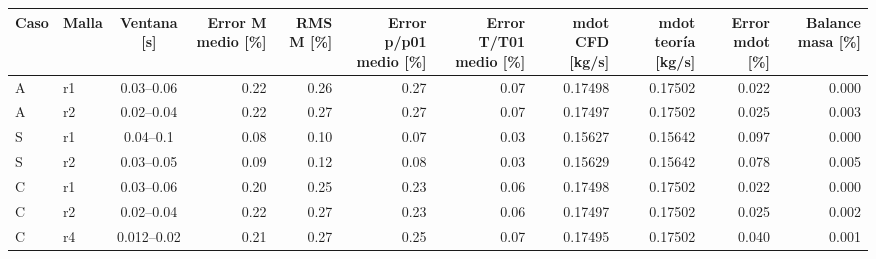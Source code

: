 \begin{tabular}{llcrrrrrrrr}
\toprule
Caso & Malla & Ventana [s] & Error M medio [\%] & RMS M [\%] & Error p/p01 medio [\%] & Error T/T01 medio [\%] & mdot CFD [kg/s] & mdot teoría [kg/s] & Error mdot [\%] & Balance masa [\%] \\
\midrule
A & r1 & 0.03–0.06 & 0.22 & 0.26 & 0.27 & 0.07 & 0.17498 & 0.17502 & 0.022 & 0.000 \\
A & r2 & 0.02–0.04 & 0.22 & 0.27 & 0.27 & 0.07 & 0.17497 & 0.17502 & 0.025 & 0.003 \\
S & r1 & 0.04–0.1 & 0.08 & 0.10 & 0.07 & 0.03 & 0.15627 & 0.15642 & 0.097 & 0.000 \\
S & r2 & 0.03–0.05 & 0.09 & 0.12 & 0.08 & 0.03 & 0.15629 & 0.15642 & 0.078 & 0.005 \\
C & r1 & 0.03–0.06 & 0.20 & 0.25 & 0.23 & 0.06 & 0.17498 & 0.17502 & 0.022 & 0.000 \\
C & r2 & 0.02–0.04 & 0.22 & 0.27 & 0.23 & 0.06 & 0.17497 & 0.17502 & 0.025 & 0.002 \\
C & r4 & 0.012–0.02 & 0.21 & 0.27 & 0.25 & 0.07 & 0.17495 & 0.17502 & 0.040 & 0.001 \\
\bottomrule
\end{tabular}
